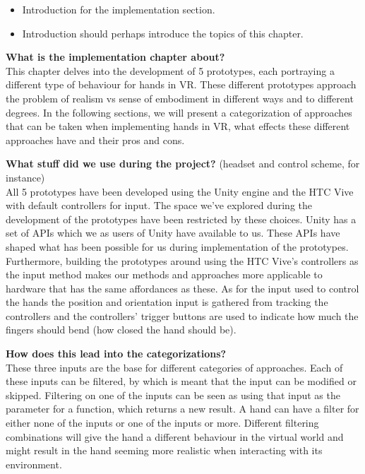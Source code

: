 \begin{itemize}
\setlength\itemsep{-0.1cm}
\item Introduction for the implementation section.
\item Introduction should perhaps introduce the topics of this chapter.
\end{itemize}

\textbf{What is the implementation chapter about?}\\
This chapter delves into the development of 5 prototypes, each portraying a different type of behaviour for hands in VR. These different prototypes approach the problem of realism vs sense of embodiment in different ways and to different degrees. In the following sections, we will present a categorization of approaches that can be taken when implementing hands in VR, what effects these different approaches have and their pros and cons.

\textbf{What stuff did we use during the project?} (headset and control scheme, for instance)\\
All 5 prototypes have been developed using the Unity engine and the HTC Vive with default controllers for input. The space we've explored during the development of the prototypes have been restricted by these choices. Unity has a set of APIs which we as users of Unity have available to us. These APIs have shaped what has been possible for us during implementation of the prototypes. Furthermore, building the prototypes around using the HTC Vive's controllers as the input method makes our methods and approaches more applicable to hardware that has the same affordances as these. As for the input used to control the hands the position and orientation input is gathered from tracking the controllers and the controllers' trigger buttons are used to indicate how much the fingers should bend (how closed the hand should be).

\textbf{How does this lead into the categorizations?}\\
These three inputs are the base for different categories of approaches. Each of these inputs can be filtered, by which is meant that the input can be modified or skipped. Filtering on one of the inputs can be seen as using that input as the parameter for a function, which returns a new result. A hand can have a filter for either none of the inputs or one of the inputs or more. Different filtering combinations will give the hand a different behaviour in the virtual world and might result in the hand seeming more realistic when interacting with its environment.

